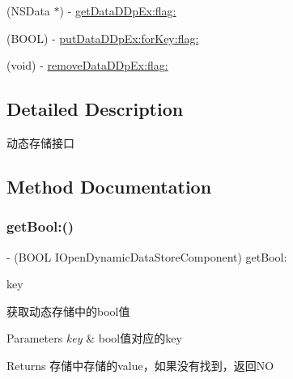 \begin{DoxyCompactItemize}
\item 
(N\+S\+Data $\ast$) -\/ \mbox{\hyperlink{protocol_i_open_dynamic_data_store_component_01-p_af49407daaff91f7747b4d20505326d70}{get\+Data\+D\+Dp\+Ex\+:flag\+:}}
\item 
(B\+O\+OL) -\/ \mbox{\hyperlink{protocol_i_open_dynamic_data_store_component_01-p_ac70899734e626501b98c25f0a15c74ca}{put\+Data\+D\+Dp\+Ex\+:for\+Key\+:flag\+:}}
\item 
(void) -\/ \mbox{\hyperlink{protocol_i_open_dynamic_data_store_component_01-p_a649514a14dbd3ced9debe86554c4777e}{remove\+Data\+D\+Dp\+Ex\+:flag\+:}}
\end{DoxyCompactItemize}


\subsection{Detailed Description}
动态存储接口 

\subsection{Method Documentation}
\mbox{\label{protocol_i_open_dynamic_data_store_component_01-p_aff1d18488599766e184833634b8a7efc}} 
\subsubsection{\texorpdfstring{get\+Bool\+:()}{getBool:()}}
{\footnotesize\ttfamily -\/ (B\+O\+OL I\+Open\+Dynamic\+Data\+Store\+Component) get\+Bool\+: \begin{DoxyParamCaption}\item[{(N\+S\+String $\ast$)}]{key }\end{DoxyParamCaption}}

获取动态存储中的bool值 
\begin{DoxyParams}{Parameters}
{\em key} & bool值对应的key \\
\hline
\end{DoxyParams}
\begin{DoxyReturn}{Returns}
存储中存储的value，如果没有找到，返回\+NO 
\end{DoxyReturn}
\mbox{\label{protocol_i_open_dynamic_data_store_component_01-p_ae66946455a2f9d57367ce8c77ae9d52f}} 
